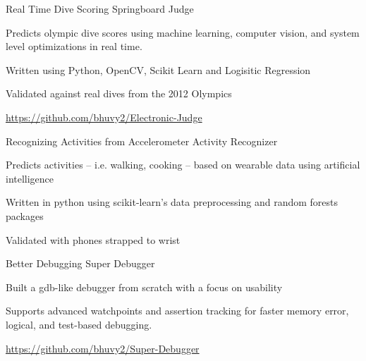 
\begin{cventries}

  \cventry
    {Real Time Dive Scoring}
    {Springboard Judge}
    {} %
    {} %
    {
      \begin{cvitems} %
        \item {Predicts olympic dive scores using machine learning, computer vision, and system level optimizations in real time.}
        \item {Written using Python, OpenCV, Scikit Learn and Logisitic Regression}
        \item {Validated against real dives from the 2012 Olympics}
        \item {\href{https://github.com/bhuvy2/Electronic-Judge}{https://github.com/bhuvy2/Electronic-Judge}}
      \end{cvitems}
    }

  \cventry
    {Recognizing Activities from Accelerometer}
    {Activity Recognizer}
    {} %
    {} %
    {
      \begin{cvitems} %
        \item {Predicts activities -- i.e. walking, cooking -- based on wearable data using artificial intelligence}
        \item {Written in python using scikit-learn’s data preprocessing and random forests packages}
        \item {Validated with phones strapped to wrist}
      \end{cvitems}
    }

   
  \cventry
    {Better Debugging}
    {Super Debugger}
    {} %
    {} %
    {
      \begin{cvitems} %
        \item {Built a gdb-like debugger from scratch with a focus on usability}
        \item {Supports advanced watchpoints and assertion tracking for faster memory error, logical, and test-based debugging.}
        \item {\href{https://github.com/bhuvy2/Super-Debugger}{https://github.com/bhuvy2/Super-Debugger}}
      \end{cvitems}
    }

\end{cventries}
